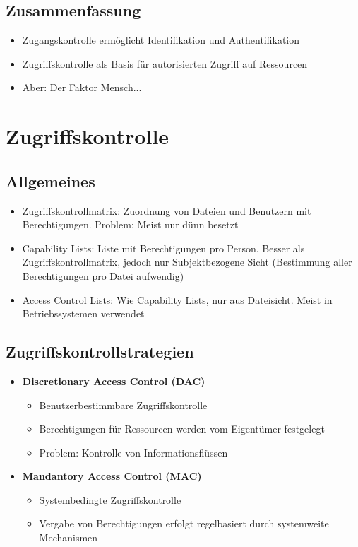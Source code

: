 \subsection{Zusammenfassung}
\begin{itemize}
	\item Zugangskontrolle ermöglicht Identifikation und Authentifikation
	\item Zugriffskontrolle als Basis für autorisierten Zugriff auf Ressourcen
	\item Aber: Der Faktor Mensch...
\end{itemize}



\section{Zugriffskontrolle}

\subsection{Allgemeines}
\begin{itemize}
	\item Zugriffskontrollmatrix: Zuordnung von Dateien und Benutzern mit Berechtigungen. Problem: Meist nur dünn besetzt
	\item Capability Lists: Liste mit Berechtigungen pro Person. Besser als Zugriffskontrollmatrix, jedoch nur Subjektbezogene Sicht (Bestimmung aller Berechtigungen pro Datei aufwendig)
	\item Access Control Lists: Wie Capability Lists, nur aus Dateisicht. Meist in Betriebssystemen verwendet
\end{itemize}


\subsection{Zugriffskontrollstrategien}
\begin{itemize}
	\item \textbf{Discretionary Access Control (DAC)}
	\begin{itemize}
		\item Benutzerbestimmbare Zugriffskontrolle
		\item Berechtigungen für Ressourcen werden vom Eigentümer festgelegt
		\item Problem: Kontrolle von Informationsflüssen
	\end{itemize}
	\item \textbf{Mandantory Access Control (MAC)}
	\begin{itemize}
		\item Systembedingte Zugriffskontrolle
		\item Vergabe von Berechtigungen erfolgt regelbasiert durch systemweite Mechanismen
	\end{itemize}
\end{itemize}

